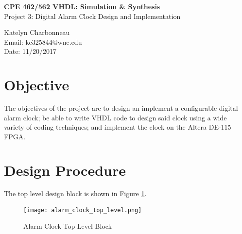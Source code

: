 \documentclass[12pt]{article}
\begin{document}
\begin{figure}[htb]
\hfil \hspace{.5in}
\end{figure}

\begin{center}
{\Large {\bf CPE 462/562 VHDL: Simulation \& Synthesis}}\\
\vspace{0.2in}
{\Large{Project 3: Digital Alarm Clock Design and Implementation}} \\
\vspace{0.2in}

Katelyn Charbonneau\\
Email: kc325844@wne.edu\\
Date: 11/20/2017\\
\end{center}


\newpage

\section{Objective} \label{sec:obj}
The objectives of the project are to design an implement a configurable digital alarm clock; be able to write VHDL code to design said clock using a wide variety of coding techniques; and implement the clock on the Altera DE-115 FPGA.

\section{Design Procedure} \label{sec:desproc}
The top level design block is shown in Figure \ref{fig:toplevel}.

\begin{figure}[!h]
\setlength{\belowcaptionskip}{-10pt}
\begin{center}
\texttt{[image: alarm\_clock\_top\_level.png]}
\caption{Alarm Clock Top Level Block}
\label{fig:toplevel}
\end{center}
\end{figure}
\end{document}
